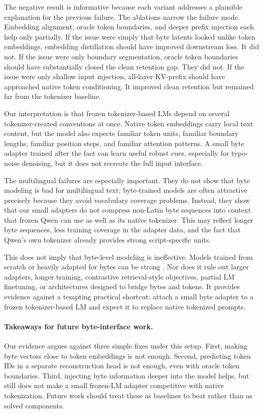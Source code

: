 \documentclass{article}
\begin{document}
The negative result is informative because each variant addresses a plausible explanation for the previous failure. The ablations narrow the failure mode. Embedding alignment, oracle token boundaries, and deeper prefix injection each help only partially. If the issue were simply that byte latents looked unlike token embeddings, embedding distillation should have improved downstream loss. It did not. If the issue were only boundary segmentation, oracle token boundaries should have substantially closed the clean retention gap. They did not. If the issue were only shallow input injection, all-layer KV-prefix should have approached native token conditioning. It improved clean retention but remained far from the tokenizer baseline.

Our interpretation is that frozen tokenizer-based LMs depend on several tokenizer-created conventions at once. Native token embeddings carry local text content, but the model also expects familiar token units, familiar boundary lengths, familiar position steps, and familiar attention patterns. A small byte adapter trained after the fact can learn useful robust cues, especially for typo-noise denoising, but it does not recreate the full input interface.

The multilingual failures are especially important. They do not show that byte modeling is bad for multilingual text; byte-trained models are often attractive precisely because they avoid vocabulary coverage problems. Instead, they show that our small adapters do not compress non-Latin byte sequences into context that frozen Qwen can use as well as its native tokenizer. This may reflect longer byte sequences, less training coverage in the adapter data, and the fact that Qwen's own tokenizer already provides strong script-specific units.

This does not imply that byte-level modeling is ineffective. Models trained from scratch or heavily adapted for bytes can be strong \citep{xue2022byt5,clark2022canine,yu2023megabyte}. Nor does it rule out larger adapters, longer training, contrastive retrieval-style objectives, partial LM finetuning, or architectures designed to bridge bytes and tokens. It provides evidence against a tempting practical shortcut: attach a small byte adapter to a frozen tokenizer-based LM and expect it to replace native tokenized prompts.

\paragraph{Takeaways for future byte-interface work.}
Our evidence argues against three simple fixes under this setup. First, making byte vectors close to token embeddings is not enough. Second, predicting token IDs in a separate reconstruction head is not enough, even with oracle token boundaries. Third, injecting byte information deeper into the model helps, but still does not make a small frozen-LM adapter competitive with native tokenization. Future work should treat these as baselines to beat rather than as solved components.
\end{document}
